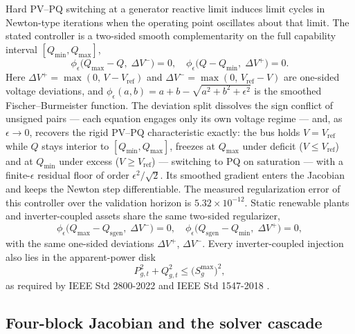Hard PV--PQ switching at a generator reactive limit induces limit cycles in Newton-type iterations when the operating point oscillates about that limit. The stated controller is a two-sided smooth complementarity on the full capability interval $[Q_{\min}, Q_{\max}]$,
\begin{equation}
\phi_\epsilon\bigl(Q_{\max} - Q,\; \Delta V^{-}\bigr) = 0, \quad
\phi_\epsilon\bigl(Q - Q_{\min},\; \Delta V^{+}\bigr) = 0.
\label{eq:qbound}
\end{equation}
Here $\Delta V^{+} = \max(0,\, V - V_{\mathrm{ref}})$ and $\Delta V^{-} = \max(0,\, V_{\mathrm{ref}} - V)$ are one-sided voltage deviations, and $\phi_\epsilon(a, b) = a + b - \sqrt{a^2 + b^2 + \epsilon^2}$ is the smoothed Fischer--Burmeister function. The deviation split dissolves the sign conflict of unsigned pairs --- each equation engages only its own voltage regime --- and, as $\epsilon \to 0$, recovers the rigid PV--PQ characteristic exactly: the bus holds $V = V_{\mathrm{ref}}$ while $Q$ stays interior to $[Q_{\min}, Q_{\max}]$, freezes at $Q_{\max}$ under deficit ($V \le V_{\mathrm{ref}}$) and at $Q_{\min}$ under excess ($V \ge V_{\mathrm{ref}}$) --- switching to PQ on saturation --- with a finite-$\epsilon$ residual floor of order $\epsilon^2/\sqrt{2}$. Its smoothed gradient enters the Jacobian and keeps the Newton step differentiable. The measured regularization error of this controller over the validation horizon is $5.32 \times 10^{-12}$. Static renewable plants and inverter-coupled assets share the same two-sided regularizer,
\begin{equation}
\phi_\epsilon\bigl(Q_{\max} - Q_{\mathrm{sgen}},\; \Delta V^{-}\bigr) = 0, \quad
\phi_\epsilon\bigl(Q_{\mathrm{sgen}} - Q_{\min},\; \Delta V^{+}\bigr) = 0,
\label{eq:qsgen}
\end{equation}
with the same one-sided deviations $\Delta V^{+}$, $\Delta V^{-}$. Every inverter-coupled injection also lies in the apparent-power disk
\begin{equation}
P_{g,t}^{2} + Q_{g,t}^{2} \le \bigl(S_{g}^{\max}\bigr)^{2},
\label{eq:capability}
\end{equation}
as required by IEEE Std 2800-2022 \cite{ieee2800} and IEEE Std 1547-2018 \cite{ieee1547}.

\subsection{Four-block Jacobian and the solver cascade}
\label{sub:jacobian}

